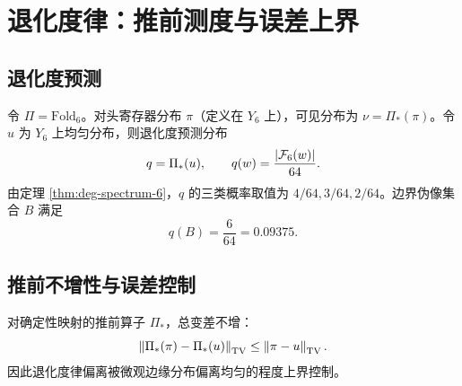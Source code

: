\section{退化度律：推前测度与误差上界}

\subsection{退化度预测}

令 $\Pi=\mathrm{Fold}_6$。对头寄存器分布 $\pi$（定义在 $Y_6$ 上），可见分布为 $\nu=\Pi_*(\pi)$。令 $u$ 为 $Y_6$ 上均匀分布，则退化度预测分布
\[
q=\Pi_*(u),\qquad q(w)=\frac{\left\lvert \mathcal{F}_6(w)\right\rvert}{64}.
\]
由定理 \ref{thm:deg-spectrum-6}，$q$ 的三类概率取值为 $4/64,3/64,2/64$。边界伪像集合 $B$ 满足
\[
q(B)=\frac{6}{64}=0.09375.
\]

\subsection{推前不增性与误差控制}

对确定性映射的推前算子 $\Pi_*$，总变差不增：
\[
\left\lVert \Pi_*(\pi)-\Pi_*(u)\right\rVert_{\mathrm{TV}}\le \left\lVert \pi-u\right\rVert_{\mathrm{TV}}.
\]
因此退化度律偏离被微观边缘分布偏离均匀的程度上界控制。

